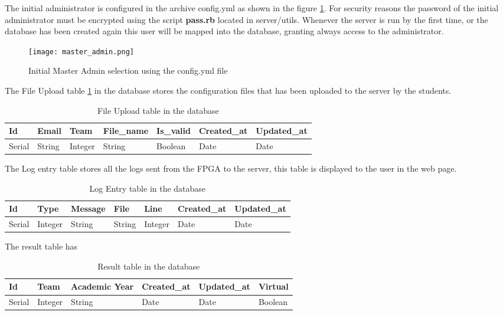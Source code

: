 The initial administrator is configured in the archive config.yml as shown in the figure \ref{fig:admin_config}. For security reasons the password of
the initial administrator must be encrypted using the script {\bf pass.rb} located in server/utils. Whenever the server is run by the first time, or the database
has been created again this user will be mapped into the database, granting always access to the administrator.

\begin{figure}[htb]
\centering
\texttt{[image: master\_admin.png]}
\caption{Initial Master Admin selection using the config.yml file}
\label{fig:admin_config}
\end{figure}

The File Upload table \ref{tab:file_upload_table} in the database stores the configuration files that has been uploaded to the server by the students.

\begin{table}
\centering
    \begin{tabular}{ | l | l | l | l | l | l | l |}
    \hline
    Id & Email & Team & File\_name & Is\_valid & Created\_at & Updated\_at  \\ \hline
    Serial & String & Integer & String & Boolean & Date & Date \\ \hline
    \end{tabular}
    \caption{File Upload table in the database}
    \label{tab:file_upload_table}
\end{table}

The Log entry table stores all the logs sent from the FPGA to the server, this table is displayed to the user in the web page.
\begin{table}
\centering
    \begin{tabular}{ | l | l | l | l | l | l | l |}
    \hline
    Id & Type & Message & File & Line & Created\_at & Updated\_at  \\ \hline
    Serial & Integer & String & String & Integer & Date & Date \\ \hline
    \end{tabular}
    \caption{Log Entry table in the database}
    \label{tab:log_entry_table}
\end{table}

The result table has
\begin{table}
\centering
    \begin{tabular}{ | l | l | l | l | l | l |}
    \hline
    Id & Team & Academic Year & Created\_at & Updated\_at & Virtual  \\ \hline
    Serial & Integer & String & Date & Date & Boolean \\ \hline
    \end{tabular}
    \caption{Result table in the database}
    \label{tab:Result_table}
\end{table}

